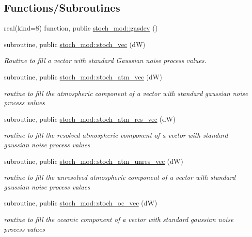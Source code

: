 \subsection*{Functions/\+Subroutines}
\begin{DoxyCompactItemize}
\item 
real(kind=8) function, public \hyperlink{namespacestoch__mod_a4ca5e456ee7b7980dcb7d2b239f0677c}{stoch\+\_\+mod\+::gasdev} ()
\item 
subroutine, public \hyperlink{namespacestoch__mod_ae9e26b4cf710198506d37e7d77685b47}{stoch\+\_\+mod\+::stoch\+\_\+vec} (dW)
\begin{DoxyCompactList}\small\item\em Routine to fill a vector with standard Gaussian noise process values. \end{DoxyCompactList}\item 
subroutine, public \hyperlink{namespacestoch__mod_aae1ccd6f37307d02916cb911fbdd605c}{stoch\+\_\+mod\+::stoch\+\_\+atm\+\_\+vec} (dW)
\begin{DoxyCompactList}\small\item\em routine to fill the atmospheric component of a vector with standard gaussian noise process values \end{DoxyCompactList}\item 
subroutine, public \hyperlink{namespacestoch__mod_a437bd49e6b3afcc2cddfc79badb94d09}{stoch\+\_\+mod\+::stoch\+\_\+atm\+\_\+res\+\_\+vec} (dW)
\begin{DoxyCompactList}\small\item\em routine to fill the resolved atmospheric component of a vector with standard gaussian noise process values \end{DoxyCompactList}\item 
subroutine, public \hyperlink{namespacestoch__mod_a03532f8f17991b20472aae0cf62e371b}{stoch\+\_\+mod\+::stoch\+\_\+atm\+\_\+unres\+\_\+vec} (dW)
\begin{DoxyCompactList}\small\item\em routine to fill the unresolved atmospheric component of a vector with standard gaussian noise process values \end{DoxyCompactList}\item 
subroutine, public \hyperlink{namespacestoch__mod_a16dca233d3cc2bae3d2dd878ffa09573}{stoch\+\_\+mod\+::stoch\+\_\+oc\+\_\+vec} (dW)
\begin{DoxyCompactList}\small\item\em routine to fill the oceanic component of a vector with standard gaussian noise process values \end{DoxyCompactList}\item 

\end{DoxyCompactItemize}
